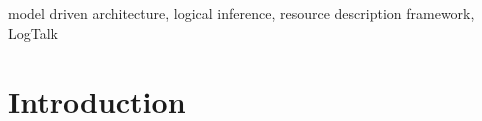 \documentclass[conference]{IEEEtran}
\begin{document}
\begin{IEEEkeywords}
model driven architecture, logical inference, resource description framework, LogTalk
\end{IEEEkeywords}

\section{Introduction}
\label{sec:intro}






\end{document}
